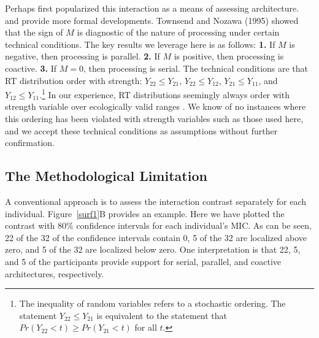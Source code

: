 \documentclass[fignum,nobf,man]{apa}
\begin{document}
Perhaps \citet{Sternberg:1969} first popularized this interaction as a means of assessing architecture. \citet{Schweikert:1978} and \citet{Schweikert:Townsend:1989} provide more formal developments.  Townsend and Nozawa (1995) showed that the sign of $M$ is diagnostic of the nature of processing under certain technical conditions.  The key results we leverage here is as follows: {\bf 1.} If $M$ is negative, then processing is parallel.  {\bf 2.} If $M$ is positive, then processing is coactive.  {\bf 3.}  If $M=0$, then processing is serial.  The technical conditions are that RT distribution order with strength: $Y_{22} \leq Y_{21}$, $Y_{22} \leq Y_{12}$, $Y_{21} \leq Y_{11}$, and $Y_{12} \leq Y_{11}$.\footnote{The inequality of random variables refers to a stochastic ordering.  The statement $Y_{22} \leq Y_{21}$ is equivalent to the statement that $Pr(Y_{22}<t) \geq Pr(Y_{21}<t)$ for all $t$.}  In our experience, RT distributions seemingly always order with strength variable over ecologically valid ranges \citep[see ][]{Luce:1986}.  We know of no instances where this ordering has been violated with strength variables such as those used here, and we accept these technical conditions as assumptions without further confirmation.

\subsection{The Methodological Limitation}
A conventional approach is to assess the interaction contrast
separately for each individual.  Figure~\ref{surf1}B provides an example.  Here we have plotted the contrast with 80\% confidence intervals for each individual's MIC.  As can be seen, 22 of the 32 of the confidence intervals
contain 0, 5 of the 32 are localized above zero, and 5 of the 32 are localized below
zero.  One interpretation is that 22, 5, and 5 of the participants provide
support for serial, parallel, and coactive architectures,
respectively. 
\end{document}
